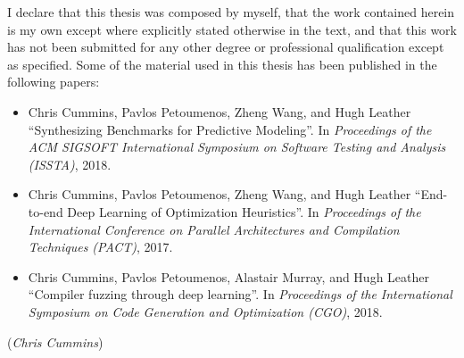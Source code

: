 I declare that this thesis was composed by myself, that the work contained herein is my own except where explicitly stated otherwise in the text, and that this work has not been submitted for any other degree or professional qualification except as specified. Some of the material used in this thesis has been published in the following papers:
\begin{itemize}
	\item Chris Cummins, Pavlos Petoumenos, Zheng Wang, and Hugh Leather ``Synthesizing Benchmarks for Predictive Modeling''. In \emph{Proceedings of the ACM SIGSOFT International Symposium on Software Testing and Analysis (ISSTA)}, 2018.
	\item Chris Cummins, Pavlos Petoumenos, Zheng Wang, and Hugh Leather ``End-to-end Deep Learning of Optimization Heuristics''. In \emph{Proceedings of the International Conference on Parallel Architectures and Compilation Techniques (PACT)}, 2017.
	\item Chris Cummins, Pavlos Petoumenos, Alastair Murray, and Hugh Leather ``Compiler fuzzing through deep learning''. In \emph{Proceedings of the International Symposium on Code Generation and Optimization (CGO)}, 2018.
\end{itemize}
\vspace{1in}\raggedleft({\em Chris Cummins\/})